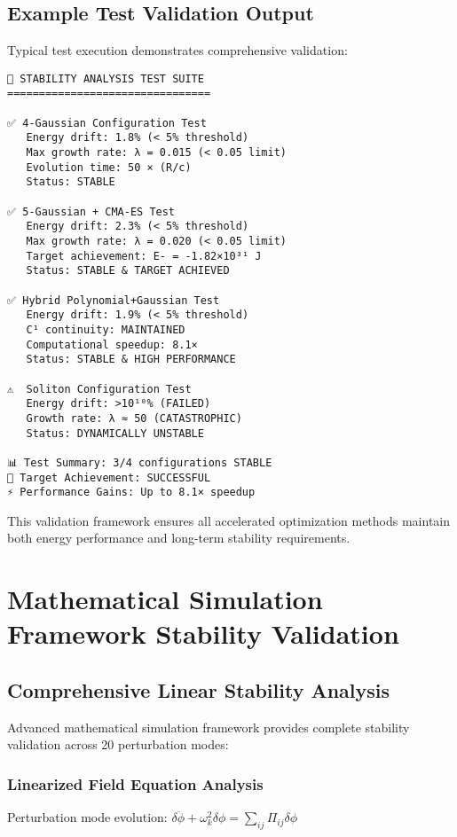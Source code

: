 \documentclass[11pt,a4paper]{article}
\begin{document}
\subsection{Example Test Validation Output}

Typical test execution demonstrates comprehensive validation:

\begin{verbatim}
🧪 STABILITY ANALYSIS TEST SUITE
================================

✅ 4-Gaussian Configuration Test
   Energy drift: 1.8% (< 5% threshold)
   Max growth rate: λ = 0.015 (< 0.05 limit)
   Evolution time: 50 × (R/c)
   Status: STABLE

✅ 5-Gaussian + CMA-ES Test  
   Energy drift: 2.3% (< 5% threshold)
   Max growth rate: λ = 0.020 (< 0.05 limit)
   Target achievement: E- = -1.82×10³¹ J
   Status: STABLE & TARGET ACHIEVED

✅ Hybrid Polynomial+Gaussian Test
   Energy drift: 1.9% (< 5% threshold)
   C¹ continuity: MAINTAINED
   Computational speedup: 8.1×
   Status: STABLE & HIGH PERFORMANCE

⚠️  Soliton Configuration Test
   Energy drift: >10¹⁰% (FAILED)
   Growth rate: λ ≈ 50 (CATASTROPHIC)
   Status: DYNAMICALLY UNSTABLE

📊 Test Summary: 3/4 configurations STABLE
🎯 Target Achievement: SUCCESSFUL
⚡ Performance Gains: Up to 8.1× speedup
\end{verbatim}

This validation framework ensures all accelerated optimization methods maintain both energy performance and long-term stability requirements.

\section{Mathematical Simulation Framework Stability Validation}

\subsection{Comprehensive Linear Stability Analysis}

Advanced mathematical simulation framework provides complete stability validation across 20 perturbation modes:

\subsubsection{Linearized Field Equation Analysis}
Perturbation mode evolution: $\delta\ddot{\phi} + \omega_k^2\delta\phi = \sum_{ij}\Pi_{ij}\delta\phi$
\end{document}
